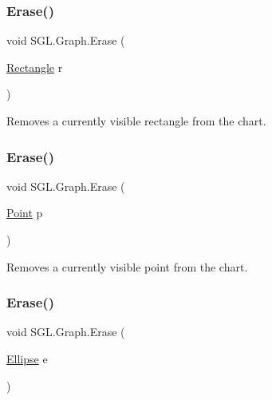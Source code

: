 \subsubsection{\texorpdfstring{Erase()}{Erase()}\hspace{0.1cm}{\footnotesize\ttfamily [4/6]}}
{\footnotesize\ttfamily void S\+G\+L.\+Graph.\+Erase (\begin{DoxyParamCaption}\item[{\mbox{\hyperlink{class_s_g_l_1_1_rectangle}{Rectangle}}}]{r }\end{DoxyParamCaption})\hspace{0.3cm}{\ttfamily [inline]}}



Removes a currently visible rectangle from the chart. 

\mbox{\label{class_s_g_l_1_1_graph_a10cb5c6b153d39591b85cdf636269976}} 
\subsubsection{\texorpdfstring{Erase()}{Erase()}\hspace{0.1cm}{\footnotesize\ttfamily [5/6]}}
{\footnotesize\ttfamily void S\+G\+L.\+Graph.\+Erase (\begin{DoxyParamCaption}\item[{\mbox{\hyperlink{struct_s_g_l_1_1_point}{Point}}}]{p }\end{DoxyParamCaption})\hspace{0.3cm}{\ttfamily [inline]}}



Removes a currently visible point from the chart. 

\mbox{\label{class_s_g_l_1_1_graph_a8fb1d75464ea237e1424b99b0a0806f7}} 
\subsubsection{\texorpdfstring{Erase()}{Erase()}\hspace{0.1cm}{\footnotesize\ttfamily [6/6]}}
{\footnotesize\ttfamily void S\+G\+L.\+Graph.\+Erase (\begin{DoxyParamCaption}\item[{\mbox{\hyperlink{class_s_g_l_1_1_ellipse}{Ellipse}}}]{e }\end{DoxyParamCaption})\hspace{0.3cm}{\ttfamily [inline]}}



